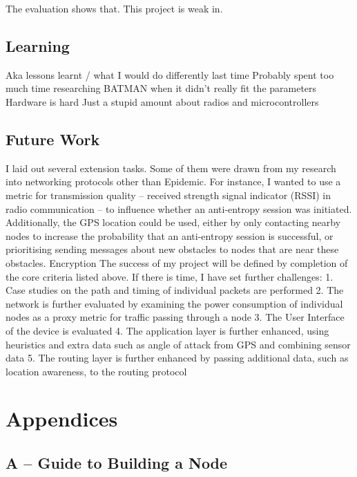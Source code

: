 \documentclass[12pt,a4paper]{report}
\begin{document}
The evaluation shows that. This project is weak in. 

\section{Learning}
Aka lessons learnt / what I would do differently last time
Probably spent too much time researching BATMAN when it didn't really fit the parameters
Hardware is hard Just a stupid amount about radios and microcontrollers

\section{Future Work}
I laid out several extension tasks. Some of them were drawn from my research into networking protocols other than Epidemic. For instance, I wanted to use a metric for transmission quality -- received strength signal indicator (RSSI) in radio communication -- to influence whether an anti-entropy session was initiated. Additionally, the GPS location could be used, either by only contacting nearby nodes to increase the probability that an anti-entropy session is successful, or prioritising sending messages about new obstacles to nodes that are near these obstacles. 
Encryption 
The success of my project will be defined by completion of the core criteria listed above. If there is
time, I have set further challenges:
1. Case studies on the path and timing of individual packets are performed
2. The network is further evaluated by examining the power consumption of individual nodes as
a proxy metric for traffic passing through a node
3. The User Interface of the device is evaluated
4. The application layer is further enhanced, using heuristics and extra data such as angle of
attack from GPS and combining sensor data
5. The routing layer is further enhanced by passing additional data, such as location awareness,
to the routing protocol







\chapter*{Appendices}

\section*{A -- Guide to Building a Node}
\label{appendixA}
\setcounter{chapter}{0}
\setcounter{figure}{0}
\end{document}
